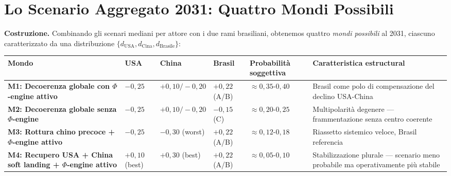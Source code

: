 \section{Lo Scenario Aggregato 2031: Quattro Mondi
Possibili}\label{lo-scenario-aggregato-2031-quattro-mondi-possibili}

\Hypoth{} \textbf{Costruzione.} Combinando gli scenari mediani per
attore con i due rami brasiliani, obtenemos quattro \emph{mondi
possibili} al 2031, ciascuno caratterizzato da una distribuzione
\(\{d_{\text{USA}}, d_{\text{Cina}}, d_{\text{Brasile}}\}\):

{\def\LTcaptype{none} %
{\small\begin{longtable}[]{@{}
  >{\raggedright\arraybackslash}p{}
  >{\raggedright\arraybackslash}p{}
  >{\raggedright\arraybackslash}p{}
  >{\raggedright\arraybackslash}p{}
  >{\raggedright\arraybackslash}p{}
  >{\raggedright\arraybackslash}p{}@{}}
\toprule\noalign{}
\begin{minipage}[b]{\linewidth}\raggedright
Mondo
\end{minipage} & \begin{minipage}[b]{\linewidth}\raggedright
USA
\end{minipage} & \begin{minipage}[b]{\linewidth}\raggedright
China
\end{minipage} & \begin{minipage}[b]{\linewidth}\raggedright
Brasil
\end{minipage} & \begin{minipage}[b]{\linewidth}\raggedright
Probabilità soggettiva
\end{minipage} & \begin{minipage}[b]{\linewidth}\raggedright
Caratteristica estructural
\end{minipage} \\
\midrule\noalign{}
\endhead
\bottomrule\noalign{}
\endlastfoot
\textbf{M1: Decoerenza globale con \(\Phi\)-engine attivo} & \(-0{,}25\)
& \(+0{,}10/-0{,}20\) & \(+0{,}22\) (A/B) &
\(\approx 0{,}35\)-\(0{,}40\) & Brasil come polo di compensazione del
declino USA-China \\
\textbf{M2: Decoerenza globale senza \(\Phi\)-engine} & \(-0{,}25\) &
\(+0{,}10/-0{,}20\) & \(-0{,}15\) (C) & \(\approx 0{,}20\)-\(0{,}25\) &
Multipolarità degenere --- frammentazione senza centro coerente \\
\textbf{M3: Rottura chino precoce + \(\Phi\)-engine attivo} &
\(-0{,}25\) & \(-0{,}30\) (worst) & \(+0{,}22\) (A/B) &
\(\approx 0{,}12\)-\(0{,}18\) & Riassetto sistemico veloce, Brasil
referencia \\
\textbf{M4: Recupero USA + China soft landing + \(\Phi\)-engine attivo} &
\(+0{,}10\) (best) & \(+0{,}30\) (best) & \(+0{,}22\) (A/B) &
\(\approx 0{,}05\)-\(0{,}10\) & Stabilizzazione plurale --- scenario
meno probabile ma operativamente più stabile \\
\end{longtable}}
}

